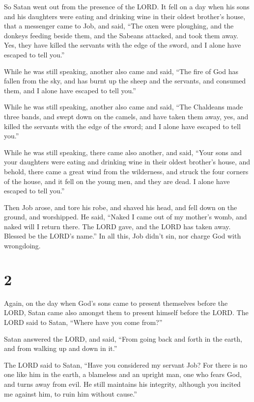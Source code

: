So Satan went out from the presence of the LORD.  It fell
on a day when his sons and his daughters were eating and drinking wine
in their oldest brother's house,  that a messenger came
to Job, and said, ``The oxen were ploughing, and the donkeys feeding
beside them,  and the Sabeans attacked, and took them
away. Yes, they have killed the servants with the edge of the sword, and
I alone have escaped to tell you.''

 While he was still speaking, another also came and said,
``The fire of God has fallen from the sky, and has burnt up the sheep
and the servants, and consumed them, and I alone have escaped to tell
you.''

 While he was still speaking, another also came and said,
``The Chaldeans made three bands, and swept down on the camels, and have
taken them away, yes, and killed the servants with the edge of the
sword; and I alone have escaped to tell you.''

 While he was still speaking, there came also another,
and said, ``Your sons and your daughters were eating and drinking wine
in their oldest brother's house,  and behold, there came
a great wind from the wilderness, and struck the four corners of the
house, and it fell on the young men, and they are dead. I alone have
escaped to tell you.''

 Then Job arose, and tore his robe, and shaved his head,
and fell down on the ground, and worshipped.  He said,
``Naked I came out of my mother's womb, and naked will I return there.
The LORD gave, and the LORD has taken away. Blessed be the LORD's
name.''  In all this, Job didn't sin, nor charge God with
wrongdoing.

\hypertarget{section-1}{%
\section{2}\label{section-1}}

 Again, on the day when God's sons came to present
themselves before the LORD, Satan came also amongst them to present
himself before the LORD.  The LORD said to Satan, ``Where
have you come from?''

Satan answered the LORD, and said, ``From going back and forth in the
earth, and from walking up and down in it.''

 The LORD said to Satan, ``Have you considered my servant
Job? For there is no one like him in the earth, a blameless and an
upright man, one who fears God, and turns away from evil. He still
maintains his integrity, although you incited me against him, to ruin
him without cause.''

